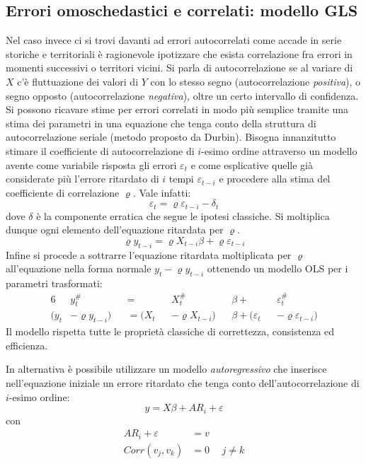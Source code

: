 \documentclass[a4page, 11pt]{article} %
\begin{document}
\subsection*{Errori omoschedastici e correlati: modello GLS}
Nel caso invece ci si trovi davanti ad errori autocorrelati come accade in serie storiche e territoriali è ragionevole ipotizzare che esista correlazione fra errori in momenti successivi o territori vicini.
Si parla di autocorrelazione se al variare di $X$ c'è fluttuazione dei valori di $Y$ con lo stesso segno (autocorrelazione \textit{positiva}), o segno opposto (autocorrelazione \textit{negativa}), oltre un certo intervallo di confidenza.
Si possono ricavare stime per errori correlati in modo più semplice tramite una stima dei parametri in una equazione che tenga conto della struttura di autocorrelazione seriale (metodo proposto da Durbin).
Bisogna innanzitutto stimare il coefficiente di autocorrelazione di $i$-esimo ordine attraverso un modello avente come variabile risposta gli errori $\varepsilon_t$ e come esplicative quelle già considerate più l’errore ritardato di $i$ tempi $\varepsilon_{t-i}$ e procedere alla stima del coefficiente di correlazione $\varrho$.
Vale infatti:
\begin{equation*}
  \varepsilon_t = \varrho \varepsilon_{t-i} - \delta_t
\end{equation*}
dove $\delta$ è la componente erratica che segue le ipotesi classiche.
Si moltiplica dunque ogni elemento dell'equazione ritardata per $\varrho$.
\begin{equation*}
  \varrho y_{t-i} = \varrho X_{t-i} \beta + \varrho \varepsilon_{t-i}
\end{equation*}
Infine si procede a sottrarre l'equazione ritardata moltiplicata per $\varrho$ all'equazione nella forma normale $y_t - \varrho y_{t-i}$ ottenendo un modello OLS per i parametri trasformati: 
\begin{alignat*}{6}
  &y_t^\# &&= &&X_t^\# &&\beta + &&\varepsilon_t^\# \\
  (y_t &- \varrho y_{t-i}) &&= (X_t &&- \varrho X_{t-i}) &&\beta + (\varepsilon_t &&- \varrho \varepsilon_{t-i})
\end{alignat*} 
Il modello rispetta tutte le proprietà classiche di correttezza, consistenza ed efficienza. 

In alternativa è possibile utilizzare un modello \textit{autoregressivo} che inserisce nell’equazione iniziale un errore ritardato che tenga conto dell’autocorrelazione di $i$-esimo ordine:
\begin{equation*}
  y = X \beta + AR_i + \varepsilon
\end{equation*}
con 
\begin{align*}
  AR_i + \varepsilon &= v \\
  Corr(v_j,v_k) &= 0 \hspace{15pt} j \neq k
\end{align*}
\end{document}
